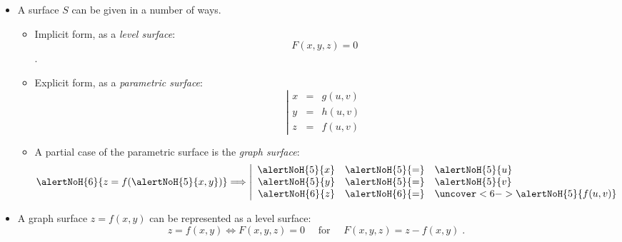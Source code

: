 \begin{frame}
\begin{itemize}
\item A surface $S$ can be given in a number of ways.

\begin{itemize}
\item<2-> Implicit form, as a \emph{level surface}: $$F(x,y,z) = 0$$.
\item<3-> Explicit form, as a \emph{parametric surface}:
\[
\left| \begin{array}{rcl}
x& = & g(u,v) \\
y& = & h(u,v) \\
z& = & f(u,v)
\end{array} \right.
\]

\item<4-> A partial case of the parametric surface is the \emph{graph surface}:
\[\alertNoH{6}{z=f(\alertNoH{5}{x,y})} \Longrightarrow 
\left| \begin{array}{rcl}
\alertNoH{5}{x} &\alertNoH{5}{=} &\alertNoH{5}{ u} \\
\alertNoH{5}{y} &\alertNoH{5}{=} &\alertNoH{5}{ v} \\
\alertNoH{6}{z} &\alertNoH{6}{=} & \uncover<6->{\alertNoH{5}{f( u,v)}}
\end{array} \right.
\]
\end{itemize}
\item<7-> A graph surface $z=f(x,y)$ can be represented as a level surface:
\[
z=f(x,y) \Longleftrightarrow F(x,y,z) =0 \quad \text{ for } \quad F(x,y,z) = z-f(x,y)\; .
\]
\end{itemize}
\end{frame}